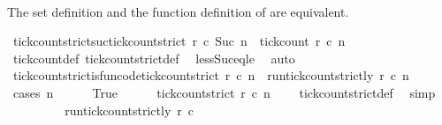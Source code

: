 \begin{isabellebody}
\ \ \ \ \isamarkupfalse%
\isanewline
{}\isamarkupfalse%
%
\endisatagproof
{\isafoldproof}%
%
\isadelimproof
%
\endisadelimproof
%
\begin{isamarkuptext}%
The set definition and the function definition of   are equivalent.%
\end{isamarkuptext}\isamarkuptrue%
\isamarkupfalse%
\ tick{\isacharunderscore}count{\isacharunderscore}strict{\isacharunderscore}suc{\isacharcolon}{\isacartoucheopen}tick{\isacharunderscore}count{\isacharunderscore}strict\ r\ c\ {\isacharparenleft}Suc\ n{\isacharparenright}\ {\isacharequal}\ tick{\isacharunderscore}count\ r\ c\ n{\isacartoucheclose}\isanewline
%
\isadelimproof
\ \ %
\endisadelimproof
%
\isatagproof
{}\isamarkupfalse%
\ tick{\isacharunderscore}count{\isacharunderscore}def\ tick{\isacharunderscore}count{\isacharunderscore}strict{\isacharunderscore}def\ \isamarkupfalse%
\ less{\isacharunderscore}Suc{\isacharunderscore}eq{\isacharunderscore}le\ \isamarkupfalse%
\ auto%
\endisatagproof
{\isafoldproof}%
%
\isadelimproof
\isanewline
%
\endisadelimproof
\isanewline
{}\isamarkupfalse%
\ tick{\isacharunderscore}count{\isacharunderscore}strict{\isacharunderscore}is{\isacharunderscore}fun{\isacharbrackleft}code{\isacharbrackright}{\isacharcolon}{\isacartoucheopen}tick{\isacharunderscore}count{\isacharunderscore}strict\ r\ c\ n\ {\isacharequal}\ run{\isacharunderscore}tick{\isacharunderscore}count{\isacharunderscore}strictly\ r\ c\ n{\isacartoucheclose}\isanewline
%
\isadelimproof
%
\endisadelimproof
%
\isatagproof
{}\isamarkupfalse%
\ {\isacharparenleft}cases\ {\isacartoucheopen}n\ {\isacharequal}\ {}{\isacartoucheclose}{\isacharparenright}\isanewline
\ \ \isamarkupfalse%
\ True\isanewline
\ \ \ \ \isamarkupfalse%
\ {\isacartoucheopen}tick{\isacharunderscore}count{\isacharunderscore}strict\ r\ c\ n\ {\isacharequal}\ {}{\isacartoucheclose}\ \isamarkupfalse%
\ tick{\isacharunderscore}count{\isacharunderscore}strict{\isacharunderscore}def\ \isamarkupfalse%
\ simp\isanewline
\ \ \ \ \isamarkupfalse%
\ \isamarkupfalse%
\ {\isacartoucheopen}{\isachardot}{\isachardot}{\isachardot}\ {\isacharequal}\ run{\isacharunderscore}tick{\isacharunderscore}count{\isacharunderscore}strictly\ r\ c\ {}{\isacartoucheclose}\ \isamarkupfalse%

\end{isabellebody}
